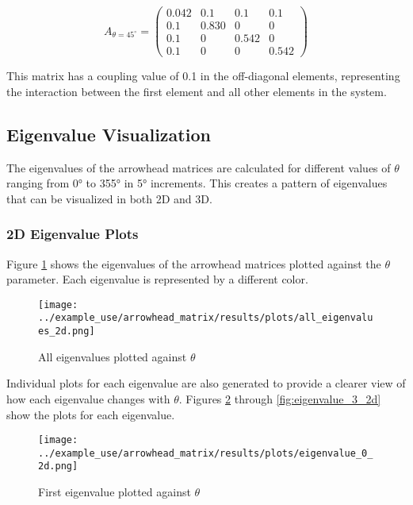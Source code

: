 \begin{equation}
A_{\theta=45^{\circ}} = 
\begin{pmatrix}
0.042 & 0.1 & 0.1 & 0.1 \\
0.1 & 0.830 & 0 & 0 \\
0.1 & 0 & 0.542 & 0 \\
0.1 & 0 & 0 & 0.542
\end{pmatrix}
\end{equation}

This matrix has a coupling value of 0.1 in the off-diagonal elements, representing the interaction between the first element and all other elements in the system.

\subsection{Eigenvalue Visualization}

The eigenvalues of the arrowhead matrices are calculated for different values of $\theta$ ranging from 0° to 355° in 5° increments. This creates a pattern of eigenvalues that can be visualized in both 2D and 3D.

\subsubsection{2D Eigenvalue Plots}

Figure \ref{fig:all_eigenvalues_2d} shows the eigenvalues of the arrowhead matrices plotted against the $\theta$ parameter. Each eigenvalue is represented by a different color.

\begin{figure}[H]
    \centering
    \texttt{[image: ../example\_use/arrowhead\_matrix/results/plots/all\_eigenvalues\_2d.png]}
    \caption{All eigenvalues plotted against $\theta$}
    \label{fig:all_eigenvalues_2d}
\end{figure}

Individual plots for each eigenvalue are also generated to provide a clearer view of how each eigenvalue changes with $\theta$. Figures \ref{fig:eigenvalue_0_2d} through \ref{fig:eigenvalue_3_2d} show the plots for each eigenvalue.

\begin{figure}[H]
    \centering
    \texttt{[image: ../example\_use/arrowhead\_matrix/results/plots/eigenvalue\_0\_2d.png]}
    \caption{First eigenvalue plotted against $\theta$}
    \label{fig:eigenvalue_0_2d}
\end{figure}

